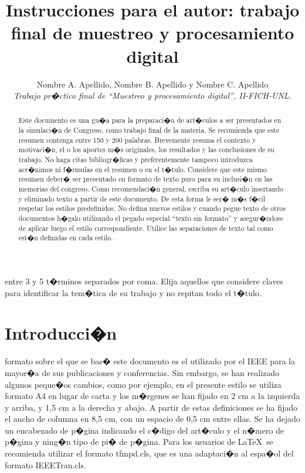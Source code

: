 \documentclass[conference,a4paper,10pt,oneside,final]{tfmpd}
\begin{document}
\title{Instrucciones para el autor: trabajo final de muestreo y procesamiento digital}

\author{Nombre A. Apellido,
        Nombre B. Apellido y 
        Nombre C. Apellido \\
\textit{Trabajo pr�ctico final de ``Muestreo y procesamiento digital'', II-FICH-UNL.}}


\maketitle

\begin{abstract}
Este documento es una gu�a para la preparaci�n de art�culos a ser presentados en la simulaci�n de Congreso, como trabajo final de la materia. Se recomienda que este resumen contenga entre 150 y 200 palabras. Brevemente resuma el contexto y motivaci�n, el o los aportes m�s originales, los resultados y las conclusiones de su trabajo. No haga citas bibliogr�ficas y preferentemente tampoco introduzca acr�nimos ni f�rmulas en el resumen o en el t�tulo. Considere que este mismo resumen deber� ser presentado en formato de texto puro para su inclusi�n en las memorias del congreso. Como 
recomendaci�n general, escriba su art�culo insertando y eliminado texto a partir de este documento. De esta forma le ser� m�s f�cil respetar los estilos predefinidos. No defina nuevos estilos y cuando pegue texto de otros documentos h�galo utilizando el pegado especial ``texto sin formato'' y asegur�ndose de aplicar luego el estilo correspondiente. Utilice las separaciones de texto tal como est�n definidas en cada estilo.
\end{abstract}

\begin{keywords}
entre 3 y 5 t�rminos separados por coma. Elija aquellos que considere claves para identificar la 
tem�tica de su trabajo y no repitan todo el t�tulo.
\end{keywords}

\section{Introducci�n}

 formato sobre el que se bas� este documento es el utilizado por el IEEE para la mayor�a de sus publicaciones y conferencias. Sin embargo, se han realizado algunos peque�os cambios, como por ejemplo, en el presente estilo se utiliza formato A4 en lugar de carta y los m�rgenes se han fijado en 2 cm a la izquierda y arriba, y 1,5 cm a la derecha y abajo. A partir de estas definiciones se ha fijado el ancho de columna en 8,5 cm, con un espacio de 0,5 cm entre ellas. Se ha dejado un encabezado de p�gina indicando el c�digo del art�culo y el n�mero de p�gina y ning�n tipo de pi� de p�gina. Para los usuarios de \LaTeX\ se recomienda utilizar el formato tfmpd.cls, que es una adaptaci�n al espa�ol del formato IEEETran.cls.
\end{document}
